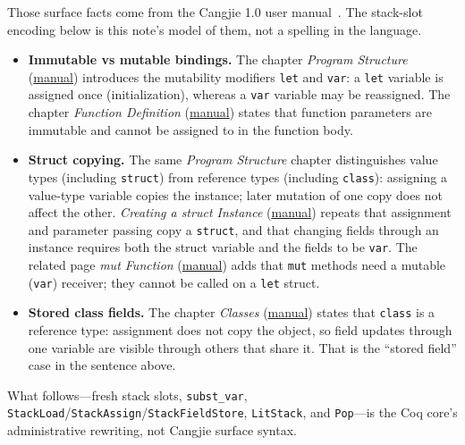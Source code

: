 \documentclass[11pt]{article}
\begin{document}
Those surface facts come from the Cangjie 1.0 user manual~\cite{cangjie-docs}.
The stack-slot encoding below is this note's model of them, not a spelling in the language.
\begin{itemize}
\item
  \textbf{Immutable vs mutable bindings.}
  The chapter \emph{Program Structure}
  (\href{https://docs.cangjie-lang.cn/en/docs/1.0.0/user_manual/source_en/basic_programming_concepts/program_structure.html}{manual})
  introduces the mutability modifiers \texttt{let} and \texttt{var}:
  a \texttt{let} variable is assigned once (initialization), whereas a \texttt{var} variable may be reassigned.
  The chapter \emph{Function Definition}
  (\href{https://docs.cangjie-lang.cn/en/docs/1.0.0/user_manual/source_en/function/define_functions.html}{manual})
  states that function parameters are immutable and cannot be assigned to in the function body.
\item
  \textbf{Struct copying.}
  The same \emph{Program Structure} chapter distinguishes value types (including \texttt{struct}) from reference types (including \texttt{class}):
  assigning a value-type variable copies the instance; later mutation of one copy does not affect the other.
  \emph{Creating a struct Instance}
  (\href{https://docs.cangjie-lang.cn/en/docs/1.0.0/user_manual/source_en/struct/create_instance.html}{manual})
  repeats that assignment and parameter passing copy a \texttt{struct}, and that changing fields through an instance requires both the struct variable and the fields to be \texttt{var}.
  The related page \emph{mut Function}
  (\href{https://docs.cangjie-lang.cn/en/docs/1.0.0/user_manual/source_en/struct/mut.html}{manual})
  adds that \texttt{mut} methods need a mutable (\texttt{var}) receiver; they cannot be called on a \texttt{let} struct.
\item
  \textbf{Stored class fields.}
  The chapter \emph{Classes}
  (\href{https://docs.cangjie-lang.cn/en/docs/1.0.0/user_manual/source_en/class_and_interface/class.html}{manual})
  states that \texttt{class} is a reference type: assignment does not copy the object, so field updates through one variable are visible through others that share it.
  That is the ``stored field'' case in the sentence above.
\end{itemize}
What follows---fresh stack slots, \texttt{subst\_var}, \texttt{StackLoad}/\texttt{StackAssign}/\texttt{StackFieldStore}, \texttt{LitStack}, and \texttt{Pop}---is the Coq core's administrative rewriting, not Cangjie surface syntax.
\end{document}
